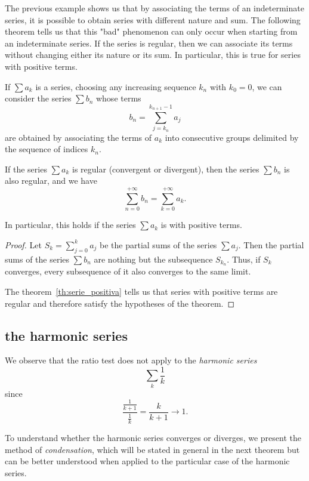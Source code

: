 The previous example shows us that by associating the terms of an indeterminate
series, it is possible to obtain series with different nature and sum.
The following theorem tells us that this "bad" phenomenon can only occur when
starting from an indeterminate series.
If the series is regular, then we can associate its terms without changing
either its nature or its sum.
In particular, this is true for series with positive terms.

\begin{theorem}%
\label{th:serie_associativa}%
If $\sum a_k$ is a series, choosing any increasing sequence $k_n$ with $k_0=0$,
we can consider the series $\sum b_n$ whose terms
\[
  b_n = \sum_{j=k_n}^{k_{n+1}-1} a_j
\]
are obtained by associating the terms of $a_k$ into consecutive groups delimited
by the sequence of indices $k_n$.

If the series $\sum a_k$ is regular (convergent or divergent), then the series
$\sum b_n$ is also regular, and we have
\[
\sum_{n=0}^{+\infty} b_n
= \sum_{k=0}^{+\infty} a_k.
\]

In particular, this holds if the series $\sum a_k$ is with positive terms.
\end{theorem}
%
\begin{proof}
Let $S_k = \sum_{j=0}^k a_j$ be the partial sums of the series $\sum a_j$. Then
the partial sums of the series $\sum b_n$ are nothing but the subsequence
$S_{k_n}$.
Thus, if $S_k$ converges, every subsequence of it also converges to the same
limit.

The theorem~\ref{th:serie_positiva} tells us that series with positive terms are
regular and therefore satisfy the hypotheses of the theorem.
\end{proof}

\subsection{the harmonic series}

We observe that the ratio test does not apply to the \emph{harmonic series}%
%
%
\[
  \sum_k \frac{1}{k}
\]
since
\[
 \frac{\frac{1}{k+1}}{\frac{1}{k}}
 = \frac{k}{k+1} \to 1.
\]

To understand whether the harmonic series converges or diverges, we present the
method of \emph{condensation}, which will be stated in general in the next
theorem but can be better understood when applied to the particular case of the
harmonic series.

